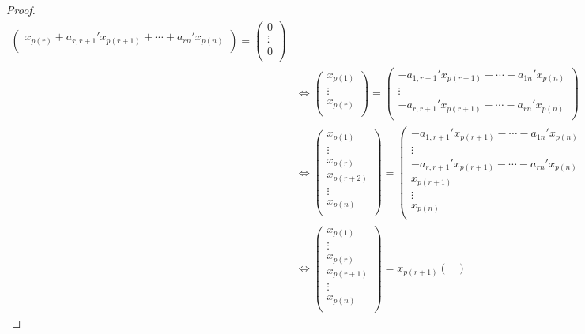 \documentclass[dvipdfmx]{jsarticle}
\begin{document}
\begin{proof}
\begin{align*}
\begin{pmatrix}
x_{p(r)} + a_{r,r + 1}'x_{p(r + 1)} + \cdots + a_{rn}'x_{p(n)} \\
\end{pmatrix} = \begin{pmatrix}
0 \\
 \vdots \\
0 \\
\end{pmatrix}\\
&\Leftrightarrow \begin{pmatrix}
x_{p(1)} \\
 \vdots \\
x_{p(r)} \\
\end{pmatrix} = \begin{pmatrix}
 - a_{1,r + 1}'x_{p(r + 1)} - \cdots - a_{1n}'x_{p(n)} \\
 \vdots \\
 - a_{r,r + 1}'x_{p(r + 1)} - \cdots - a_{rn}'x_{p(n)} \\
\end{pmatrix}\\
&\Leftrightarrow \begin{pmatrix}
x_{p(1)} \\
 \vdots \\
x_{p(r)} \\
x_{p(r + 2)} \\
 \vdots \\
x_{p(n)} \\
\end{pmatrix} = \begin{pmatrix}
 - a_{1,r + 1}'x_{p(r + 1)} - \cdots - a_{1n}'x_{p(n)} \\
 \vdots \\
 - a_{r,r + 1}'x_{p(r + 1)} - \cdots - a_{rn}'x_{p(n)} \\
x_{p(r + 1)} \\
 \vdots \\
x_{p(n)} \\
\end{pmatrix}\\
&\Leftrightarrow \begin{pmatrix}
x_{p(1)} \\
 \vdots \\
x_{p(r)} \\
x_{p(r + 1)} \\
 \vdots \\
x_{p(n)} \\
\end{pmatrix} = x_{p(r + 1)}\begin{pmatrix}

\end{pmatrix}
\end{align*}
\end{proof}
\end{document}
